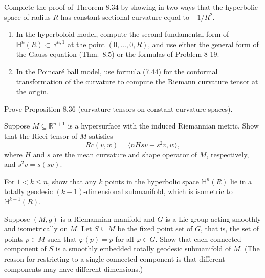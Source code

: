 \begin{exercise}
\label{prob:hyperbolic-constant-curvature}
Complete the proof of Theorem 8.34 by showing in two ways that the hyperbolic space of radius $R$ has constant sectional curvature equal to $-1/R^2$.

\begin{enumerate}
\item[(a)] In the hyperboloid model, compute the second fundamental form of $\mathbb{H}^n(R) \subset \mathbb{R}^{n,1}$ at the point $(0,\ldots,0,R)$, and use either the general form of the Gauss equation (Thm.\ 8.5) or the formulas of Problem 8-19.

\item[(b)] In the Poincar\'e ball model, use formula (7.44) for the conformal transformation of the curvature to compute the Riemann curvature tensor at the origin.
\end{enumerate}
\end{exercise}

\begin{exercise}
\label{prob:curvature-tensors-constant-curvature}
Prove Proposition 8.36 (curvature tensors on constant-curvature spaces).
\end{exercise}

\begin{exercise}
\label{prob:ricci-tensor-hypersurface}
Suppose $M \subseteq \mathbb{R}^{n+1}$ is a hypersurface with the induced Riemannian metric. Show that the Ricci tensor of $M$ satisfies
\[
Rc(v,w) = \langle nHsv - s^2v, w\rangle,
\]
where $H$ and $s$ are the mean curvature and shape operator of $M$, respectively, and $s^2v = s(sv)$.
\end{exercise}

\begin{exercise}
\label{prob:k-points-hyperbolic-geodesic}
For $1 < k \leq n$, show that any $k$ points in the hyperbolic space $\mathbb{H}^n(R)$ lie in a totally geodesic $(k-1)$-dimensional submanifold, which is isometric to $\mathbb{H}^{k-1}(R)$.
\end{exercise}

\begin{exercise}
\label{prob:lie-group-fixed-point-geodesic}
Suppose $(M, g)$ is a Riemannian manifold and $G$ is a Lie group acting smoothly and isometrically on $M$. Let $S \subseteq M$ be the fixed point set of $G$, that is, the set of points $p \in M$ such that $\varphi(p) = p$ for all $\varphi \in G$. Show that each connected component of $S$ is a smoothly embedded totally geodesic submanifold of $M$. (The reason for restricting to a single connected component is that different components may have different dimensions.)
\end{exercise}


